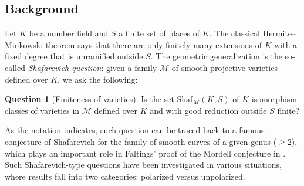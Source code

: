 \documentclass[11pt,reqno,oneside]{amsart}
\numberwithin{equation}{section}
\theoremstyle{definition}
\newtheorem{question}[theorem]{Question}
\newcommand{\Sha}{\mathrm{Shaf}}
\begin{document}
\subsection{Background}
Let $K$ be a number field and $S$ a finite set of places of $K$. The classical Hermite--Minkowski theorem says that there are only finitely many extensions of $K$ with a fixed degree that is unramified outside $S$. The geometric generalization is the so-called \textit{Shafarevich question}: given a family $\mathcal{M}$ of smooth projective varieties defined over $K$, we ask the following:
\begin{question}[Finiteness of varieties] \label{Question}
Is the set $\Sha_{\mathcal{M}}(K, S)$ of $K$-isomorphism classes of varieties in $\mathcal{M}$ defined over $K$ and with good reduction outside $S$ finite? 
\end{question}
As the notation indicates, such question can be traced back to a famous conjecture of Shafarevich \cite{ShafarevichICM} for the family of smooth curves of a given genus ($\geq 2$), which plays an important role in Faltings' proof of the Mordell conjecture in \cite{Faltings83}.  Such Shafarevich-type questions have been investigated in various situations, where results fall into two categories: polarized versus unpolarized.
\end{document}
